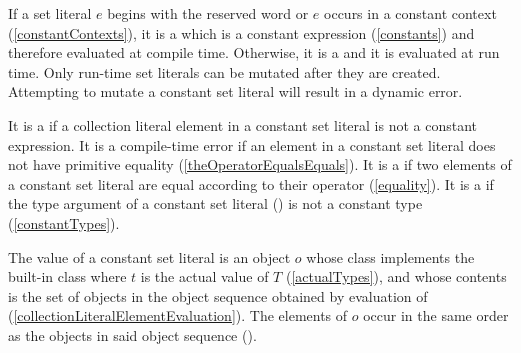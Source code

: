 \documentclass[makeidx]{article}
\begin{document}
{

\LMHash{}%
If a set literal $e$ begins with the reserved word \CONST{}
or $e$ occurs in a constant context
(\ref{constantContexts}),
it is a
which is a constant expression
(\ref{constants})
and therefore evaluated at compile time.
Otherwise, it is a
and it is evaluated at run time.
Only run-time set literals can be mutated after they are created.
Attempting to mutate a constant set literal will result in a dynamic error.


\LMHash{}%
It is a  if
a collection literal element in a constant set literal
is not a constant expression.
It is a compile-time error if
an element in a constant set literal
does not have primitive equality
(\ref{theOperatorEqualsEquals}).
It is a
 if two elements of a constant set literal are equal
according to their \lit{==} operator
(\ref{equality}).
It is a  if the type argument of a constant set literal
()
is not a constant type
(\ref{constantTypes}).


\LMHash{}%
The value of a constant set literal
is an object $o$ whose class implements the built-in class
where $t$ is the actual value of $T$
(\ref{actualTypes}),
and whose contents is the set of objects in
the object sequence  obtained by
evaluation of 
(\ref{collectionLiteralElementEvaluation}).
The elements of $o$ occur in the same order as
the objects in said object sequence
().

}
\end{document}
